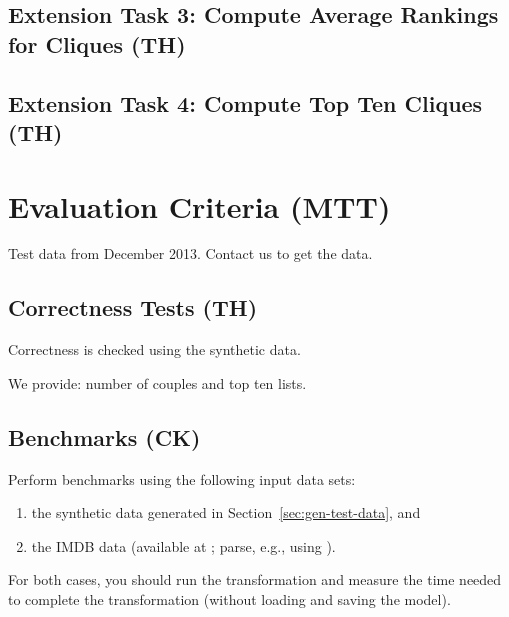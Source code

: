 \documentclass[a4paper]{article}
\begin{document}

\subsection{Extension Task 3: Compute Average Rankings for Cliques (TH)}

\subsection{Extension Task 4: Compute Top Ten Cliques (TH)}



\section{Evaluation Criteria (MTT)}

Test data from December 2013. Contact us to get the data.

\subsection{Correctness Tests (TH)}

Correctness is checked using the synthetic data.

We provide: number of couples and top ten lists.

\subsection{Benchmarks (CK)}

Perform benchmarks using the following input data sets:
\begin{enumerate}
\item the synthetic data generated in Section~\ref{sec:gen-test-data}, and 
\item the IMDB data (available at \cite{IMDBDATA}; parse, e.g., using \cite{IMDB2EMF}).
\end{enumerate}
For both cases, you should run the transformation and measure 
the time needed to complete the transformation (without loading 
and saving the model).
\end{document}
